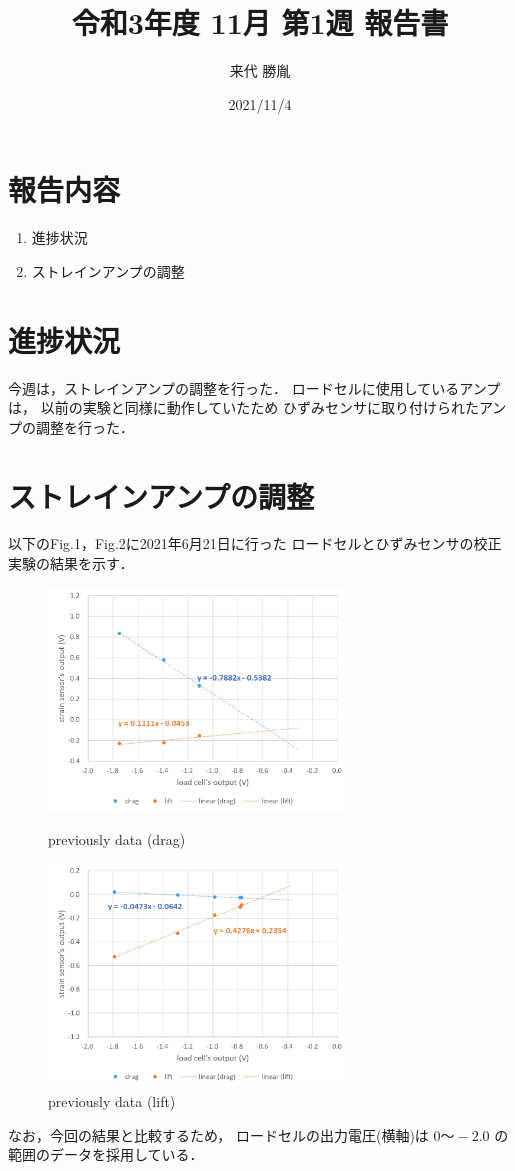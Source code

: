 \documentclass[twocolumn,a4j]{jsarticle}
\author{来代 勝胤}
\title{令和3年度 11月 第1週 報告書}
\date{2021/11/4}
\begin{document}
\columnseprule=0.1mm

\maketitle
\section*{報告内容}
\begin{enumerate}[1.]
    \item 進捗状況
    \item ストレインアンプの調整
\end{enumerate}
\section{進捗状況}
今週は，ストレインアンプの調整を行った．
ロードセルに使用しているアンプは，
以前の実験と同様に動作していたため
ひずみセンサに取り付けられたアンプの調整を行った．
\section{ストレインアンプの調整}
以下のFig.1，Fig.2に2021年6月21日に行った
ロードセルとひずみセンサの校正実験の結果を示す．
\begin{figure}[htbp]
    \footnotesize
    \begin{center}
        \includegraphics[width=80mm]{../images/previously_drag.png}
        \caption{previously data (drag)}
        \includegraphics[width=80mm]{../images/previously_lift.png}
        \caption{previously data (lift)}
    \end{center}
\end{figure}\par
なお，今回の結果と比較するため，
ロードセルの出力電圧(横軸)は $0 ～ -2.0$ の範囲のデータを採用している．
\newpage
\end{document}

